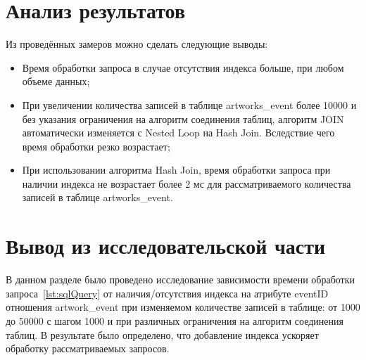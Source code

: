 \section{Анализ результатов}
Из проведённых замеров можно сделать следующие выводы:
\begin{itemize}
	\item {Время обработки запроса в случае отсутствия индекса больше, при любом объеме данных;}
	\item {При увеличении количества записей в таблице artworks\_event более 10000 и без указания ограничения на алгоритм соединения таблиц, алгоритм JOIN автоматически изменяется с Nested Loop на Hash Join. Вследствие чего время обработки резко возрастает;}
	\item {При использовании алгоритма Hash Join, время обработки запроса при наличии индекса не возрастает более 2 мс для рассматриваемого количества записей в таблице artworks\_event.}
\end{itemize}



\section{Вывод из исследовательской части}
 В данном разделе было проведено исследование зависимости времени обработки запроса~\ref{lst:sqlQuery} от наличия/отсутствия индекса на атрибуте eventID отношения artwork\_event при изменяемом количестве записей в таблице: от 1000 до 50000 с шагом 1000 и при различных ограничения на алгоритм соединения таблиц. В результате было определено, что добавление индекса ускоряет обработку рассматриваемых запросов.


\clearpage
